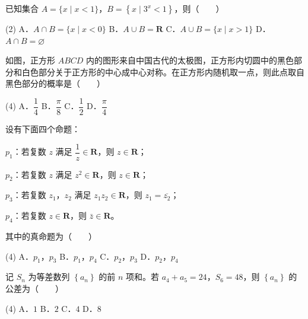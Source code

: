 \begin{question}
已知集合 $A=\{x\mid x<1\}$，$B=\left\{x\mid3^{x}<1\right\}$，则\mbox{（　　）}

\begin{gkopts}(2)
\task A．$A\cap B=\{x\mid x<0\}$
\task B．$A\cup B=\mathbf R$
\task C．$A\cup B=\{x\mid x>1\}$
\task D．$A\cap B=\varnothing$
\end{gkopts}

\Needspace{0.4\textheight}
\end{question}
\begin{question}
如图，正方形 $ABCD$ 内的图形来自中国古代的太极图，正方形内切圆中的黑色部分和白色部分关于正方形的中心成中心对称。在正方形内随机取一点，则此点取自黑色部分的概率是\mbox{（　　）}
\nopagebreak[4]
\begin{center}\end{center}
\nopagebreak[4]
\begin{gkopts}(4)
\task A．$\dfrac14$
\task B．$\dfrac\pi8$
\task C．$\dfrac12$
\task D．$\dfrac\pi4$
\end{gkopts}

\end{question}
\begin{question}
设有下面四个命题：

  $p_1$：若复数 $z$ 满足 $\dfrac1z\in\mathbf R$，则 $z\in\mathbf R$；

  $p_2$：若复数 $z$ 满足 $z^{2}\in\mathbf R$，则 $z\in\mathbf R$；

  $p_3$：若复数 $z_1$，$z_2$ 满足 $z_1z_2\in\mathbf R$，则 $z_1=\overline{z_2}$；

  $p_4$：若复数 $z\in\mathbf R$，则 $\bar z\in\mathbf R$。

其中的真命题为\mbox{（　　）}

\begin{gkopts}(4)
\task A．$p_1$，$p_3$
\task B．$p_1$，$p_4$
\task C．$p_2$，$p_3$
\task D．$p_2$，$p_4$
\end{gkopts}

\end{question}
\begin{question}
记 $S_n$ 为等差数列 $\left\{a_n\right\}$ 的前 $n$ 项和。若 $a_4+a_5=24$，$S_6=48$，则 $\left\{a_n\right\}$ 的公差为\mbox{（　　）}

\begin{gkopts}(4)
\task A．$1$
\task B．$2$
\task C．$4$
\task D．$8$
\end{gkopts}

\end{question}
